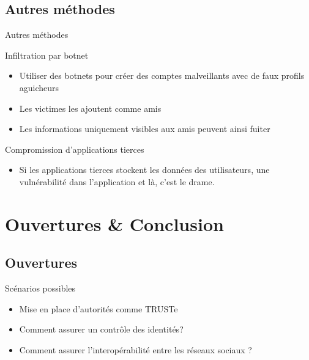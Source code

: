 \subsection{Autres méthodes}
\begin{frame}{Autres méthodes}
    \begin{block}{Infiltration par botnet}
        \begin{itemize}
            \item Utiliser des botnets pour créer des comptes malveillants avec de faux
profils aguicheurs
            \item Les victimes les ajoutent comme amis
            \item Les informations uniquement visibles aux amis peuvent ainsi fuiter
        \end{itemize}
    \end{block}
    \begin{block}{Compromission d'applications tierces}
        \begin{itemize}
            \item Si les applications tierces stockent les données des
utilisateurs, une
                vulnérabilité dans l'application et là, c'est le drame.
        \end{itemize}
    \end{block}
\end{frame}

\section{Ouvertures \& Conclusion}

\subsection{Ouvertures}
\begin{frame}{Scénarios possibles}
    \begin{itemize}
        \item Mise en place d'autorités comme TRUSTe
        \item Comment assurer un contrôle des identités?
        \item Comment assurer l'interopérabilité entre les réseaux sociaux ?
    \end{itemize}
\end{frame}
